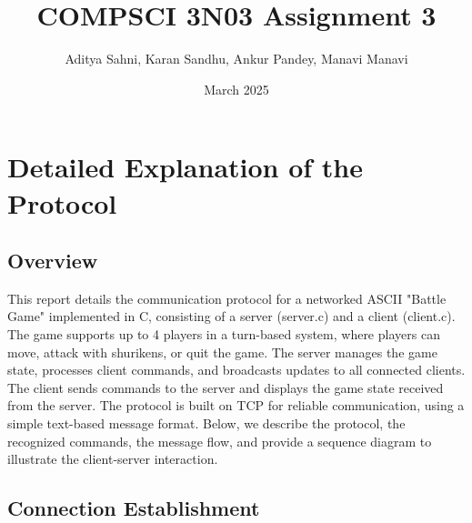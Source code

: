 \documentclass{article}
\title{COMPSCI 3N03 Assignment 3}
\author{Aditya Sahni, Karan Sandhu, Ankur Pandey, Manavi Manavi }
\date{March 2025}
\begin{document}
\maketitle

\section*{Detailed Explanation of the Protocol}

\subsection*{Overview}
This report details the communication protocol for a networked ASCII "Battle Game" implemented in C, consisting of a server (server.c) and a client (client.c). The game supports up to 4 players in a turn-based system, where players can move, attack with shurikens, or quit the game. The server manages the game state, processes client commands, and broadcasts updates to all connected clients. The client sends commands to the server and displays the game state received from the server.
\newline
\newline
The protocol is built on TCP for reliable communication, using a simple text-based message format. Below, we describe the protocol, the recognized commands, the message flow, and provide a sequence diagram to illustrate the client-server interaction.

\subsection*{Connection Establishment}
\end{document}
